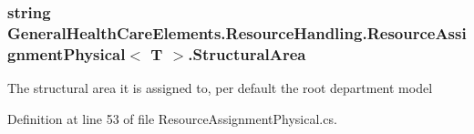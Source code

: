 \subsubsection[{\texorpdfstring{Structural\+Area}{StructuralArea}}]{\setlength{\rightskip}{0pt plus 5cm}string {\bf General\+Health\+Care\+Elements.\+Resource\+Handling.\+Resource\+Assignment\+Physical}$<$ T $>$.{\bf Structural\+Area}\hspace{0.3cm}{\ttfamily [get]}}\hypertarget{class_general_health_care_elements_1_1_resource_handling_1_1_resource_assignment_physical_a5b1d197591089a546ef04d477933dec5}{}\label{class_general_health_care_elements_1_1_resource_handling_1_1_resource_assignment_physical_a5b1d197591089a546ef04d477933dec5}


The structural area it is assigned to, per default the root department model 



Definition at line 53 of file Resource\+Assignment\+Physical.\+cs.

